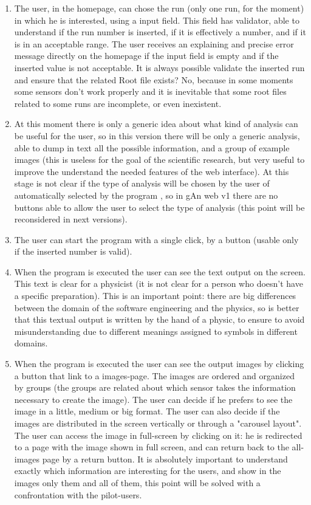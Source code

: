 \begin{enumerate}

\item The user, in the homepage, can chose the run (only one run, for the moment) in which he is interested, using a input field. This field has validator, able to understand if the run number is inserted, if it is effectively a number, and if it is in an acceptable range. The user receives an explaining and precise error message directly on the homepage if the input field is empty and if the inserted value is not acceptable. It is always possible validate the inserted run and ensure that the related Root file exists? No, because in some moments some sensors don't work properly and it is inevitable that some root files related to some runs are incomplete, or even inexistent.

\item At this moment there is only a generic idea about what kind of analysis can be useful for the user, so in this version there will be only a generic analysis, able to dump in text all the possible information, and a group of example images (this is useless for the goal of the scientific research, but very useful to improve the understand the needed features of the web interface).
At this stage is not clear if the type of analysis will be chosen by the user of automatically selected by the program , so in gAn web v1 there are no buttons able to allow the user to select the type of analysis (this point will be reconsidered in next versions).

\item The user can start the program with a single click, by a button (usable only if the inserted number is valid).

\item When the program is executed the user can see the text output on the screen. This text is clear for a physicist (it is not clear for a person who doesn't have a specific preparation). This is an important point: there are big differences between the domain of the software engineering and the physics, so is better that this textual output is written by the hand of a physic, to ensure to avoid misunderstanding due to different meanings assigned to symbols in different domains.

\item When the program is executed the user can see the output images by clicking a button that link to a images-page. The images are ordered and organized by groups (the groups are related about which sensor takes the information necessary to create the image). The user can decide if he prefers to see the image in a little, medium or big format. The user can also decide if the images are distributed in the screen vertically or through a "carousel layout". The user can access the image in full-screen by clicking on it: he is redirected to a page with the image shown in full screen, and can return back to the all-images page by a return button. It is absolutely important to understand exactly which information are interesting for the users, and show in the images only them and all of them, this point will be solved with a confrontation with the pilot-users. 


\end{enumerate}
